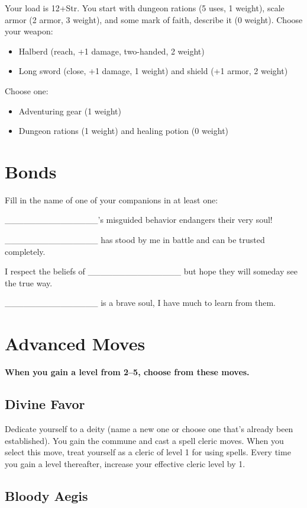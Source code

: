 Your load is 12+Str. You start with dungeon rations (5 uses, 1 weight), scale armor (2 armor, 3 weight), and some mark of faith, describe it (0 weight). Choose your weapon:
\begin{itemize}
\item Halberd (reach, +1 damage, two-handed, 2 weight)
\item Long sword (close, +1 damage, 1 weight) and shield (+1 armor, 2 weight)

\end{itemize}

Choose one:
\begin{itemize}
\item Adventuring gear (1 weight)
\item Dungeon rations (1 weight) and healing potion (0 weight)

\end{itemize}
\section*{Bonds}

Fill in the name of one of your companions in at least one:

\_\_\_\_\_\_\_\_\_\_\_\_\_\_\_'s misguided behavior endangers their very soul!

\_\_\_\_\_\_\_\_\_\_\_\_\_\_\_ has stood by me in battle and can be trusted completely.

I respect the beliefs of \_\_\_\_\_\_\_\_\_\_\_\_\_\_\_ but hope they will someday see the true way.

\_\_\_\_\_\_\_\_\_\_\_\_\_\_\_ is a brave soul, I have much to learn from them.
\section*{Advanced Moves}

{\bfseries When you gain a level from 2--5, choose from these moves.}
\subsection{Divine Favor}

Dedicate yourself to a deity (name a new one or choose one that's already been established). You gain the commune and cast a spell cleric moves. When you select this move, treat yourself as a cleric of level 1 for using spells. Every time you gain a level thereafter, increase your effective cleric level by 1.
\subsection{Bloody Aegis}

